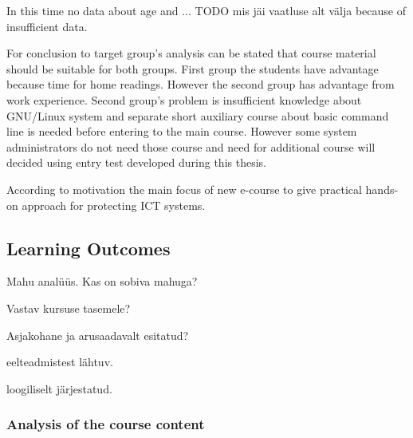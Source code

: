 In this time no data about age and ... {\color{red} TODO mis jäi vaatluse alt välja} because of insufficient data. 



For conclusion to target group's analysis can be stated that course material should be suitable for both groups. First group the students have advantage because time for home readings. However the second group has advantage from work experience. Second group's problem is insufficient knowledge about GNU/Linux system and separate short auxiliary course about basic command line is needed before entering to the main course. However some system administrators do not need those course and need for additional course will decided using entry test developed during this thesis.

According to motivation the main focus of new e-course to give practical hands-on approach for protecting \gls{ICT} systems.


\subsection{Learning Outcomes}

{\color{red} 

Mahu analüüs. Kas on sobiva mahuga?

Vastav kursuse tasemele?

Asjakohane ja arusaadavalt esitatud?

eelteadmistest lähtuv.

loogiliselt järjestatud.

}
\subsubsection{Analysis of the course content}

